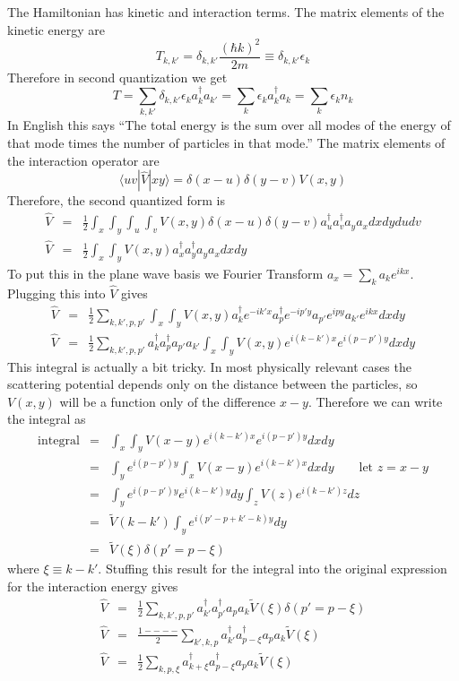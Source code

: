 \documentclass{article}
\begin{document}
The Hamiltonian has kinetic and interaction terms. The matrix elements
of the kinetic energy are\[
T_{k,k'}=\delta_{k,k'}\frac{\left(\hbar k\right)^{2}}{2m}\equiv\delta_{k,k'}\epsilon_{k}\]
Therefore in second quantization we get\[
T=\sum_{k,k'}\delta_{k,k'}\epsilon_{k}a_{k}^{\dagger}a_{k'}=\sum_{k}\epsilon_{k}a_{k}^{\dagger}a_{k}=\sum_{k}\epsilon_{k}n_{k}\]
In English this says {}``The total energy is the sum over all modes
of the energy of that mode times the number of particles in that mode.''
The matrix elements of the interaction operator are\[
\langle uv|\hat{V}|xy\rangle=\delta(x-u)\delta(y-v)V(x,y)\]
Therefore, the second quantized form is\begin{eqnarray*}
\hat{V} & = & \frac{1}{2}\int_{x}\int_{y}\int_{u}\int_{v}V(x,y)\delta(x-u)\delta(y-v)a_{u}^{\dagger}a_{v}^{\dagger}a_{y}a_{x}dxdydudv\\
\hat{V} & = & \frac{1}{2}\int_{x}\int_{y}V(x,y)a_{x}^{\dagger}a_{y}^{\dagger}a_{y}a_{x}dxdy\end{eqnarray*}
To put this in the plane wave basis we Fourier Transform $a_{x}=\sum_{k}a_{k}e^{ikx}$.
Plugging this into $\hat{V}$ gives\begin{eqnarray*}
\hat{V} & = & \frac{1}{2}\sum_{k,k',p,p'}\int_{x}\int_{y}V(x,y)a_{k}^{\dagger}e^{-ik'x}a_{p}^{\dagger}e^{-ip'y}a_{p'}e^{ipy}a_{k'}e^{ikx}dxdy\\
\hat{V} & = & \frac{1}{2}\sum_{k,k',p,p'}a_{k}^{\dagger}a_{p}^{\dagger}a_{p'}a_{k'}\int_{x}\int_{y}V(x,y)e^{i(k-k')x}e^{i(p-p')y}dxdy\end{eqnarray*}
This integral is actually a bit tricky. In most physically relevant
cases the scattering potential depends only on the distance between
the particles, so $V(x,y)$ will be a function only of the difference
$x-y$. Therefore we can write the integral as\begin{eqnarray*}
\textrm{integral} & = & \int_{x}\int_{y}V(x-y)e^{i(k-k')x}e^{i(p-p')y}dxdy\\
 & = & \int_{y}e^{i(p-p')y}\int_{x}V(x-y)e^{i(k-k')x}dxdy\qquad\textrm{let }z=x-y\\
 & = & \int_{y}e^{i(p-p')y}e^{i(k-k')y}dy\int_{z}V(z)e^{i(k-k')z}dz\\
 & = & \tilde{V}(k-k')\int_{y}e^{i(p'-p+k'-k)y}dy\\
 & = & \tilde{V}(\xi)\delta(p'=p-\xi)\end{eqnarray*}
where $\xi\equiv k-k'$. Stuffing this result for the integral into
the original expression for the interaction energy gives\begin{eqnarray*}
\hat{V} & = & \frac{1}{2}\sum_{k,k',p,p'}a_{k'}^{\dagger}a_{p'}^{\dagger}a_{p}a_{k}\tilde{V}(\xi)\delta(p'=p-\xi)\\
\hat{V} & = & \frac{1----}{2}\sum_{k',k,p}a_{k'}^{\dagger}a_{p-\xi}^{\dagger}a_{p}a_{k}\tilde{V}(\xi)\\
\hat{V} & = & \frac{1}{2}\sum_{k,p,\xi}a_{k+\xi}^{\dagger}a_{p-\xi}^{\dagger}a_{p}a_{k}\tilde{V}(\xi)\end{eqnarray*}
\end{document}
